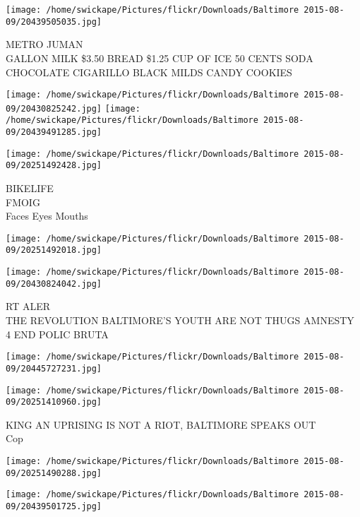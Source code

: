 \documentclass[10pt,letterpaper]{article}
\begin{document}
\vspace{0.25in}
\texttt{[image: /home/swickape/Pictures/flickr/Downloads/Baltimore 2015-08-09/20439505035.jpg]}

METRO JUMAN\\
GALLON MILK \$3.50 BREAD \$1.25 CUP OF ICE 50 CENTS SODA CHOCOLATE CIGARILLO BLACK MILDS CANDY COOKIES\\
\pagebreak

\texttt{[image: /home/swickape/Pictures/flickr/Downloads/Baltimore 2015-08-09/20430825242.jpg]}
\texttt{[image: /home/swickape/Pictures/flickr/Downloads/Baltimore 2015-08-09/20439491285.jpg]}

\vspace{0.25in}
\texttt{[image: /home/swickape/Pictures/flickr/Downloads/Baltimore 2015-08-09/20251492428.jpg]}

BIKELIFE\\
FMOIG\\
Faces Eyes Mouths\\
\pagebreak

\texttt{[image: /home/swickape/Pictures/flickr/Downloads/Baltimore 2015-08-09/20251492018.jpg]}

\vspace{0.25in}
\texttt{[image: /home/swickape/Pictures/flickr/Downloads/Baltimore 2015-08-09/20430824042.jpg]}

RT ALER\\
THE REVOLUTION BALTIMORE'S YOUTH ARE NOT THUGS AMNESTY 4 END POLIC BRUTA\\
\pagebreak

\texttt{[image: /home/swickape/Pictures/flickr/Downloads/Baltimore 2015-08-09/20445727231.jpg]}

\vspace{0.25in}
\texttt{[image: /home/swickape/Pictures/flickr/Downloads/Baltimore 2015-08-09/20251410960.jpg]}

KING AN UPRISING IS NOT A RIOT, BALTIMORE SPEAKS OUT\\
Cop\\
\pagebreak

\texttt{[image: /home/swickape/Pictures/flickr/Downloads/Baltimore 2015-08-09/20251490288.jpg]}

\vspace{0.25in}
\texttt{[image: /home/swickape/Pictures/flickr/Downloads/Baltimore 2015-08-09/20439501725.jpg]}
\end{document}
